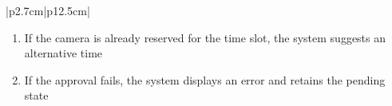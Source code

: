 \begin{table}[H]
\begin{tabular}{|p{2.7cm}|p{12.5cm}|}
\begin{minipage}[t]{\linewidth}
\begin{enumerate}[topsep=0pt,itemsep=1pt,parsep=0pt,partopsep=0pt]
                                          \item If the camera is already reserved for the time slot, the system suggests an
                                                alternative time
                                          \item If the approval fails, the system displays an error and retains the pending
                                                state
                                      \end{enumerate}
                                  \end{minipage} \\
        \hline
    \end{tabular}
    \label{tab:admin-approve-camera-reservation}
\end{table}
